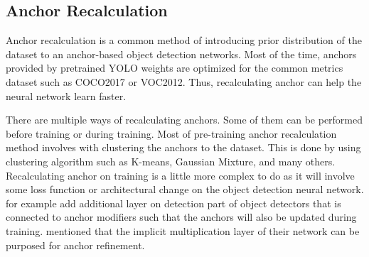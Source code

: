 

  \subsection{Anchor Recalculation}
  \label{section:anchor_recalc_study}
  Anchor recalculation is a common method of introducing prior distribution of the dataset to an anchor-based object
  detection networks. Most of the time, anchors provided by pretrained YOLO weights are optimized for the common metrics
  dataset such as COCO2017 or VOC2012. Thus, recalculating anchor can help the neural network learn faster.

  There are multiple ways of recalculating anchors. Some of them can be performed before training or during training.
  Most of pre-training anchor recalculation method involves with clustering the anchors to the dataset. This is done by
  using clustering algorithm such as K-means, Gaussian Mixture, and many others. Recalculating anchor on training is 
  a little more complex to do as it will involve some loss function or architectural change on the object detection neural network.
  \textcite{anchoropt} for example add additional layer on detection part of object detectors that is connected to anchor modifiers such that
  the anchors will also be updated during training. \textcite{yolor} mentioned that the implicit multiplication layer of their network
  can be purposed for anchor refinement.

